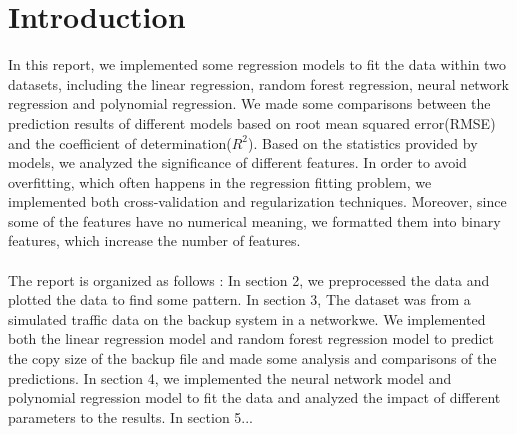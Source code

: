 \documentclass{article}
\begin{document}
\tableofcontents
\section{Introduction}
In this report, we implemented some regression models to fit the data within two datasets, including the linear regression, random forest regression, neural network regression and polynomial regression. We made some comparisons between the prediction results of different models based on root mean squared error(RMSE) and the coefficient of determination($R^2$).
Based on the statistics provided by models, we analyzed the significance of different features. In order to avoid overfitting, which often happens in the regression fitting problem, we implemented both cross-validation and regularization techniques. Moreover, since some of the features have no numerical meaning, we formatted them into binary features, which increase the number of features. \\
\\
The report is organized as follows : In section 2, we preprocessed the data and plotted the data to find some pattern. In section 3, The dataset was from a simulated traffic data on the backup system in a networkwe. We implemented both the linear regression model and random forest regression model to predict the copy size of the backup file and made some analysis and comparisons of the predictions. In section 4, we implemented the neural network model and polynomial regression model to fit the data and analyzed the impact of different parameters to the results. In section 5...
\end{document}

